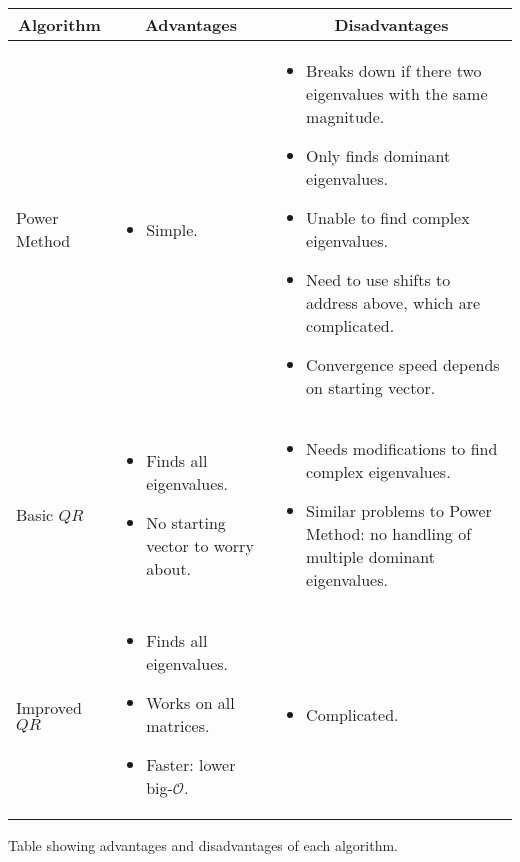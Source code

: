 \documentclass{article}
\begin{document}
\begin{center}
	\begin{tabular}{|p{0.7in}||p{2.7in}|p{3.3in}|}
		\hline
		\multicolumn{1}{|c||}{Algorithm} &
		\multicolumn{1}{c|}{Advantages} &
		\multicolumn{1}{c|}{Disadvantages} \\
		\hline
		\hline
		\vspace{\topsep}\centering Power Method &
		\begin{itemize}
			\item Simple.
		\end{itemize} &
		\begin{itemize}
			\item Breaks down if there two eigenvalues with the same magnitude.
			\item Only finds dominant eigenvalues.
			\item Unable to find complex eigenvalues.
			\item Need to use shifts to address above, which are complicated.
			\item Convergence speed depends on starting vector.
		\end{itemize} \\
		\hline
		\vspace{\topsep}\centering Basic $QR$ &
		\begin{itemize}
			\item Finds all eigenvalues.
			\item No starting vector to worry about.
		\end{itemize} &
		\begin{itemize}
			\item Needs modifications to find complex eigenvalues.
			\item Similar problems to Power Method: no handling of multiple dominant eigenvalues.
		\end{itemize} \\
		\hline
		\vspace{\topsep}\centering Improved $QR$ &
		\begin{itemize}
			\item Finds all eigenvalues.
			\item Works on all matrices.
			\item Faster: lower big-$\mathcal O$.
		\end{itemize} &
		\begin{itemize}
			\item Complicated.
		\end{itemize} \\
		\hline
	\end{tabular}

	Table showing advantages and disadvantages of each algorithm.
\end{center}

\pagebreak
\printbibliography
\end{document}
